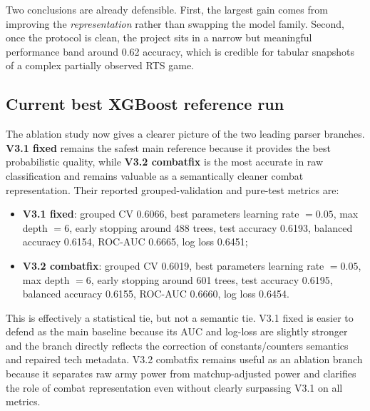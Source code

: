 \documentclass[11pt,a4paper]{article}
\begin{document}
Two conclusions are already defensible. First, the largest gain comes from improving the \emph{representation} rather than swapping the model family. Second, once the protocol is clean, the project sits in a narrow but meaningful performance band around 0.62 accuracy, which is credible for tabular snapshots of a complex partially observed RTS game.

\subsection{Current best XGBoost reference run}
The ablation study now gives a clearer picture of the two leading parser branches. \textbf{V3.1 fixed} remains the safest main reference because it provides the best probabilistic quality, while \textbf{V3.2 combatfix} is the most accurate in raw classification and remains valuable as a semantically cleaner combat representation. Their reported grouped-validation and pure-test metrics are:
\begin{itemize}
    \item \textbf{V3.1 fixed}: grouped CV 0.6066, best parameters learning rate $=0.05$, max depth $=6$, early stopping around 488 trees, test accuracy 0.6193, balanced accuracy 0.6154, ROC-AUC 0.6665, log loss 0.6451;
    \item \textbf{V3.2 combatfix}: grouped CV 0.6019, best parameters learning rate $=0.05$, max depth $=6$, early stopping around 601 trees, test accuracy 0.6195, balanced accuracy 0.6155, ROC-AUC 0.6660, log loss 0.6454.
\end{itemize}

This is effectively a statistical tie, but not a semantic tie. V3.1 fixed is easier to defend as the main baseline because its AUC and log-loss are slightly stronger and the branch directly reflects the correction of constants/counters semantics and repaired tech metadata. V3.2 combatfix remains useful as an ablation branch because it separates raw army power from matchup-adjusted power and clarifies the role of combat representation even without clearly surpassing V3.1 on all metrics.
\end{document}
